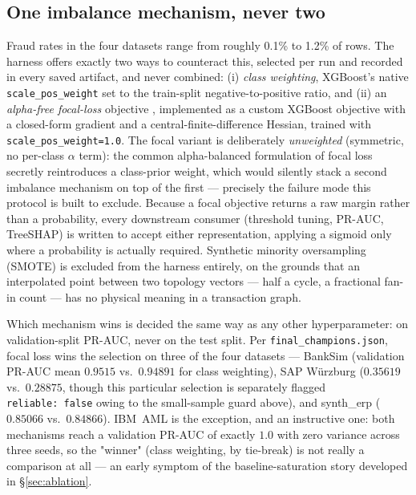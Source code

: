 \subsection{One imbalance mechanism, never two}
Fraud rates in the four datasets range from roughly 0.1\% to 1.2\% of rows. The harness offers exactly two ways to counteract this, selected per run and recorded in every saved artifact, and never combined: (i) \emph{class weighting}, XGBoost's native \texttt{scale\_pos\_weight} set to the train-split negative-to-positive ratio, and (ii) an \emph{alpha-free focal-loss} objective \cite{lin2017focal}, implemented as a custom XGBoost objective with a closed-form gradient and a central-finite-difference Hessian, trained with \texttt{scale\_pos\_weight=1.0}. The focal variant is deliberately \emph{unweighted} (symmetric, no per-class $\alpha$ term): the common alpha-balanced formulation of focal loss secretly reintroduces a class-prior weight, which would silently stack a second imbalance mechanism on top of the first — precisely the failure mode this protocol is built to exclude. Because a focal objective returns a raw margin rather than a probability, every downstream consumer (threshold tuning, PR-AUC, TreeSHAP) is written to accept either representation, applying a sigmoid only where a probability is actually required. Synthetic minority oversampling (SMOTE) is excluded from the harness entirely, on the grounds that an interpolated point between two topology vectors — half a cycle, a fractional fan-in count — has no physical meaning in a transaction graph.

Which mechanism wins is decided the same way as any other hyperparameter: on validation-split PR-AUC, never on the test split. Per \texttt{final\_champions.json}, focal loss wins the selection on three of the four datasets — BankSim (validation PR-AUC mean $0.9515$ vs.\ $0.94891$ for class weighting), SAP W\"urzburg ($0.35619$ vs.\ $0.28875$, though this particular selection is separately flagged \texttt{reliable:\ false} owing to the small-sample guard above), and synth\_erp ($0.85066$ vs.\ $0.84866$). IBM~AML is the exception, and an instructive one: both mechanisms reach a validation PR-AUC of exactly $1.0$ with zero variance across three seeds, so the "winner" (class weighting, by tie-break) is not really a comparison at all — an early symptom of the baseline-saturation story developed in \S\ref{sec:ablation}.

